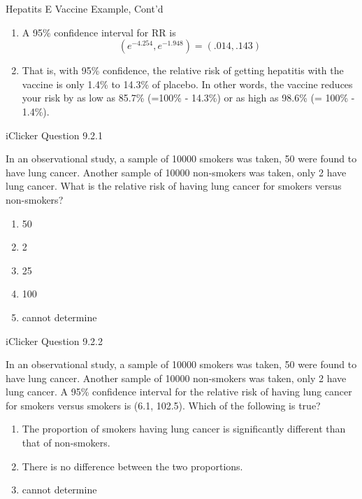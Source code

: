 \documentclass[14pt]{beamer}\usepackage[]{graphicx}\usepackage[]{color}
\begin{document}
\begin{frame}[fragile]{Hepatits E Vaccine Example, Cont'd}

\begin{enumerate}
\item<1-> A 95\% confidence interval for RR is
\begin{equation*}
    (e^{-4.254}, e^{-1.948} ) = (.014, .143)
  \end{equation*}
  
\item<2-> That is, with 95\% confidence, the relative risk of getting hepatitis with the vaccine is only 1.4\% to 14.3\% of placebo. In other words, the vaccine reduces your risk by as low as 85.7\% (=100\% - 14.3\%) or as high as 98.6\% (= 100\% - 1.4\%).
\end{enumerate}

\end{frame}

\begin{frame}[fragile]{iClicker Question 9.2.1}

In an observational study, a sample of 10000 smokers was taken, 50  were found to have lung cancer. Another sample of 10000 non-smokers was taken, only 2 have lung cancer. What is the relative  risk of having lung cancer for smokers versus non-smokers?

\begin{enumerate}
  \item 50
  \item 2
  \item 25  
  \item 100
  \item cannot determine
\end{enumerate}
\end{frame}

\begin{frame}[fragile]{iClicker Question 9.2.2}

In an observational study, a sample of 10000 smokers was taken, 50  were found to have lung cancer. Another sample of 10000 non-smokers was taken, only 2 have lung cancer. A 95\% confidence  interval for the relative risk of having lung cancer for smokers versus  smokers is (6.1, 102.5). Which of the following is true?

\begin{enumerate}
\item The proportion of smokers having lung cancer is  significantly different than that of non-smokers.
\item There is no difference between the two proportions.
\item cannot determine
\end{enumerate}
\end{frame}
\end{document}
